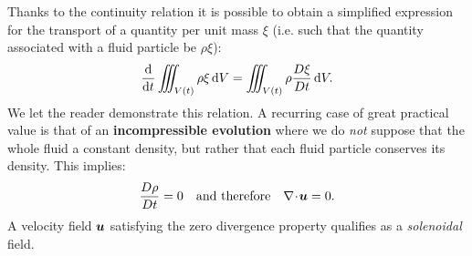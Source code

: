  Thanks to the continuity relation it is possible to obtain a simplified expression for the transport of a quantity per unit mass $\xi$ (i.e. such that the quantity associated with a fluid particle be $\rho\xi$):
\begin{equation}
\frac{\mathrm d }{\mathrm d t} \iiint_{V(t)} \rho \xi\, \mathrm dV = \iiint_{V(t)} \rho \frac{D \xi}{D t} \,\mathrm dV.
\end{equation}
We let the reader demonstrate this relation.
A recurring case of great practical value is that of an \textbf{incompressible evolution} where we do \textit{not} suppose that the whole fluid a constant density, but rather that each fluid particle conserves its density. This implies:
\begin{equation}
\D{\rho}{t} = 0 \quad\text{and therefore}\quad \nabla\!\cdot\!\bu=0.
\end{equation}
A velocity field  $\bu$ satisfying the zero divergence property qualifies as a \textit{solenoidal} field.
